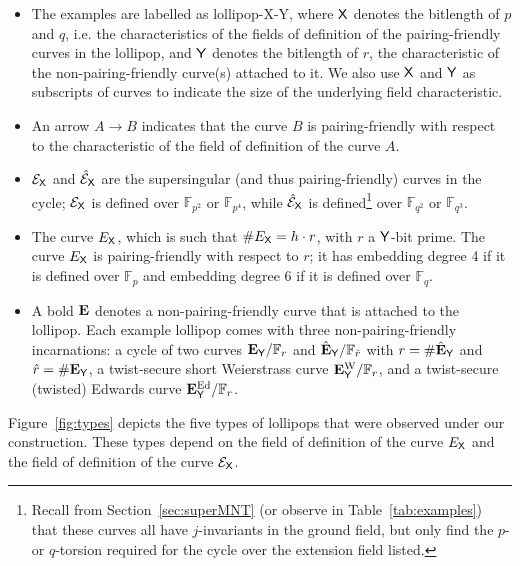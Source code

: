 \documentclass[version=preprint]{iacrcc}
\newcommand{\F}{\mathbb{F}}
\newcommand{\EC}{\mathcal{E}}
\begin{document}
\begin{itemize}
\item The examples are labelled as \textsf{lollipop-X-Y}, where ${\sf X}$ denotes the bitlength of $p$ and $q$, i.e. the characteristics of the fields of definition of the pairing-friendly curves in the lollipop, and ${\sf Y}$ denotes the bitlength of $r$, the characteristic of the non-pairing-friendly curve(s) attached to it. We also use ${\sf X}$ and ${\sf Y}$ as subscripts of curves to indicate the size of the underlying field characteristic. 
\item An arrow $A \rightarrow  B$ indicates that the curve $B$ is pairing-friendly with respect to the characteristic of the field of definition of the curve $A$.
\item $\EC_{\sf X}$ and $\hat{\EC}_{\sf X}$ are the supersingular (and thus pairing-friendly) curves in the cycle; $\EC_{\sf X}$ is defined over $\F_{p^2}$ or $\F_{p^4}$, while $\hat{\EC}_{\sf X}$ is defined\footnote{Recall from Section~\ref{sec:superMNT} (or observe in Table~\ref{tab:examples}) that these curves all have $j$-invariants in the ground field, but only find the $p$- or $q$-torsion required for the cycle over the extension field listed.} over $\F_{q^2}$ or $\F_{q^3}$.
\item The curve $E_{\sf X}$, which is such that $\#E_{\sf X}=h \cdot r$, with $r$ a ${\sf Y}$-bit prime. The curve $E_{\sf X}$ is pairing-friendly with respect to $r$; it has embedding degree 4 if it is defined over $\F_p$ and embedding degree 6 if it is defined over $\F_q$. 
\item A bold ${\bf E}$ denotes a non-pairing-friendly curve that is attached to the lollipop. Each example lollipop comes with three non-pairing-friendly incarnations: a cycle of two curves ${\bf E}_{\sf Y}/\F_r$ and $\hat{\bf E}_{\sf Y}/\F_{\hat{r}}$ with $r=\#\hat{\bf E}_{\sf Y}$ and $\hat{r}=\#{\bf E}_{\sf Y}$, a twist-secure short Weierstrass curve  ${\bf E}^{\rm W}_{\sf Y}/\F_r$, and a twist-secure (twisted) Edwards curve ${\bf E}^{\rm Ed}_{\sf Y}/\F_r$.
\end{itemize}

Figure~\ref{fig:types} depicts the five types of lollipops that were observed under our construction. These types depend on the field of definition of the curve $E_{\sf X}$ and the field of definition of the curve $\EC_{\sf X}$. \\
\end{document}
